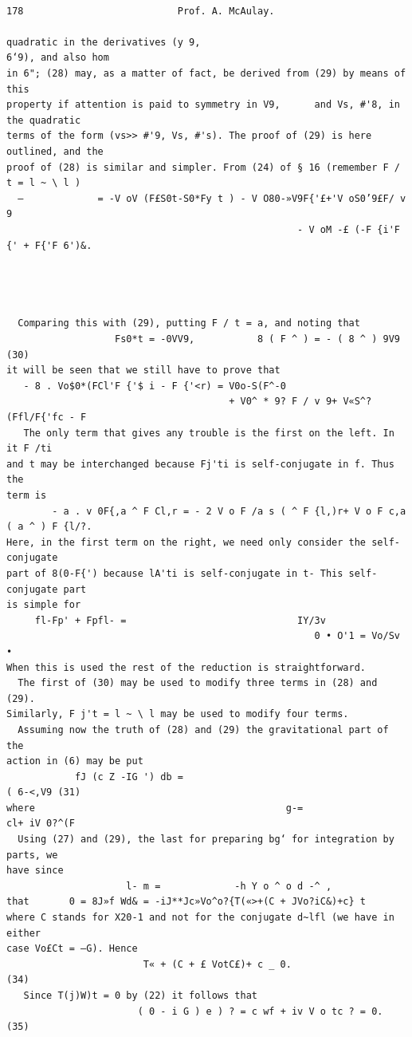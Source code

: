 \documentclass[10pt]{article}
\begin{document}
\clearpage
\begin{verbatim}

178                           Prof. A. McAulay.

quadratic in the derivatives (y 9,                                     6‘9), and also hom
in 6"; (28) may, as a matter of fact, be derived from (29) by means of this
property if attention is paid to symmetry in V9,      and Vs, #'8, in the quadratic
terms of the form (vs>> #'9, Vs, #'s). The proof of (29) is here outlined, and the
proof of (28) is similar and simpler. From (24) of § 16 (remember F / t = l ~ \ l )
  —             = -V oV (F£S0t-S0*Fy t ) - V O80-»V9F{'£+'V oS0’9£F/ v 9
                                                   - V oM -£ (-F {i'F {' + F{'F 6')&.




  Comparing this with (29), putting F / t = a, and noting that
                   Fs0*t = -0VV9,           8 ( F ^ ) = - ( 8 ^ ) 9V9              (30)
it will be seen that we still have to prove that
   - 8 . Vo$0*(FCl'F {'$ i - F {'<r) = V0o-S(F^-0
                                       + V0^ * 9? F / v 9+ V«S^?(Ffl/F{'fc - F
   The only term that gives any trouble is the first on the left. In it F /ti
and t may be interchanged because Fj'ti is self-conjugate in f. Thus the
term is
        - a . v 0F{,a ^ F Cl,r = - 2 V o F /a s ( ^ F {l,)r+ V o F c,a ( a ^ ) F {l/?.
Here, in the first term on the right, we need only consider the self-conjugate
part of 8(0-F{') because lA'ti is self-conjugate in t- This self-conjugate part
is simple for
     fl-Fp' + Fpfl- =                              IY/3v
                                                      0 • O'1 = Vo/Sv •
When this is used the rest of the reduction is straightforward.
  The first of (30) may be used to modify three terms in (28) and (29).
Similarly, F j't = l ~ \ l may be used to modify four terms.
  Assuming now the truth of (28) and (29) the gravitational part of the
action in (6) may be put
            fJ (c Z -IG ') db =                                                  ( 6-<,V9 (31)
where                                            g-=                           cl+ iV 0?^(F
  Using (27) and (29), the last for preparing bg‘ for integration by parts, we
have since
                     l- m =             -h Y o ^ o d -^ ,
that       0 = 8J»f Wd& = -iJ**Jc»Vo^o?{T(«>+(C + JVo?iC&)+c} t
where C stands for X20-1 and not for the conjugate d~lfl (we have in either
case Vo£Ct = —G). Hence
                        T« + (C + £ VotC£)+ c _ 0.                    (34)
   Since T(j)W)t = 0 by (22) it follows that
                       ( 0 - i G ) e ) ? = c wf + iv V o tc ? = 0.                 (35)


\end{verbatim}
\end{document}
